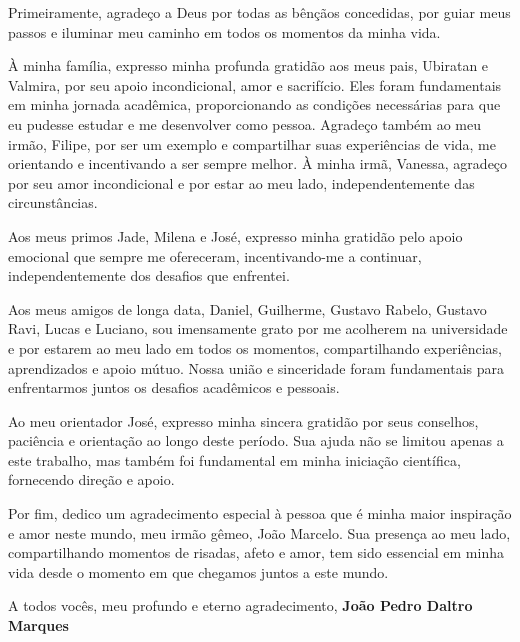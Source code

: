 \begin{agradecimentos}
Primeiramente, agradeço a Deus por todas as bênçãos concedidas, por guiar meus passos e iluminar meu caminho em todos os momentos da minha vida.

À minha família, expresso minha profunda gratidão aos meus pais, Ubiratan e Valmira, por seu apoio incondicional, amor e sacrifício. Eles foram fundamentais em minha jornada acadêmica, proporcionando as condições necessárias para que eu pudesse estudar e me desenvolver como pessoa. Agradeço também ao meu irmão, Filipe, por ser um exemplo e compartilhar suas experiências de vida, me orientando e incentivando a ser sempre melhor. À minha irmã, Vanessa, agradeço por seu amor incondicional e por estar ao meu lado, independentemente das circunstâncias.

Aos meus primos Jade, Milena e José, expresso minha gratidão pelo apoio emocional que sempre me ofereceram, incentivando-me a continuar, independentemente dos desafios que enfrentei.

Aos meus amigos de longa data, Daniel, Guilherme, Gustavo Rabelo, Gustavo Ravi, Lucas e Luciano, sou imensamente grato por me acolherem na universidade e por estarem ao meu lado em todos os momentos, compartilhando experiências, aprendizados e apoio mútuo. Nossa união e sinceridade foram fundamentais para enfrentarmos juntos os desafios acadêmicos e pessoais.

Ao meu orientador José, expresso minha sincera gratidão por seus conselhos, paciência e orientação ao longo deste período. Sua ajuda não se limitou apenas a este trabalho, mas também foi fundamental em minha iniciação científica, fornecendo direção e apoio.

Por fim, dedico um agradecimento especial à pessoa que é minha maior inspiração e amor neste mundo, meu irmão gêmeo, João Marcelo. Sua presença ao meu lado, compartilhando momentos de risadas, afeto e amor, tem sido essencial em minha vida desde o momento em que chegamos juntos a este mundo.

A todos vocês, meu profundo e eterno agradecimento,
\textbf{João Pedro Daltro Marques}
\end{agradecimentos}

